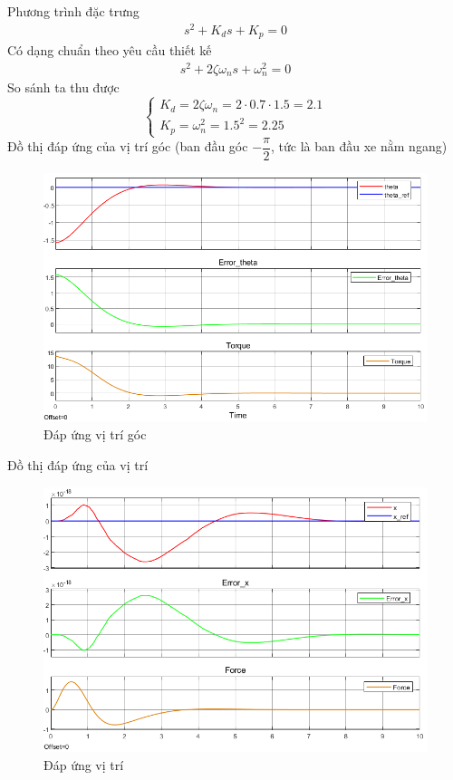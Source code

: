         Phương trình đặc trưng
        \begin{align*}
            s^2 + K_d s + K_p = 0
        \end{align*}
        Có dạng chuẩn theo yêu cầu thiết kế
        \begin{align*}
            s^2 + 2\zeta \omega_n s + \omega_n^2 = 0
        \end{align*}
        So sánh ta thu được
        \begin{equation*}
            \begin{cases}
                K_d = 2\zeta \omega_n  = 2 \cdot 0.7 \cdot 1.5 = 2.1\\
                K_p = \omega_n^2 = 1.5^2 = 2.25
            \end{cases}
        \end{equation*}
        Đồ thị đáp ứng của vị trí góc (ban đầu góc $-\dfrac{\pi}{2}$, tức là ban đầu xe nằm ngang)
        \begin{figure}[H]
            \centering
            \includegraphics[width=1\textwidth]{pictures/torce.png}
            \caption{Đáp ứng vị trí góc}
        \end{figure}
        Đồ thị đáp ứng của vị trí
        \begin{figure}[H]
            \centering
            \includegraphics[width=1\textwidth]{pictures/force.png}
            \caption{Đáp ứng vị trí}
        \end{figure}